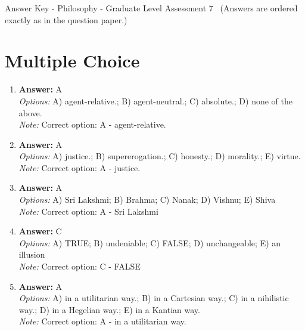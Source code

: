 \documentclass[12pt]{article}
\begin{document}
\begin{center}
Answer Key - Philosophy - Graduate Level Assessment 7 \
\small (Answers are ordered exactly as in the question paper.)
\end{center}

\section*{Multiple Choice}
\begin{enumerate}[label=\arabic*.]
\item \textbf{Answer:} A
\\ \textit{Options:} A) agent-relative.; B) agent-neutral.; C) absolute.; D) none of the above.
\\ \textit{Note:} Correct option: A - agent-relative.
\item \textbf{Answer:} A
\\ \textit{Options:} A) justice.; B) supererogation.; C) honesty.; D) morality.; E) virtue.
\\ \textit{Note:} Correct option: A - justice.
\item \textbf{Answer:} A
\\ \textit{Options:} A) Sri Lakshmi; B) Brahma; C) Nanak; D) Vishnu; E) Shiva
\\ \textit{Note:} Correct option: A - Sri Lakshmi
\item \textbf{Answer:} C
\\ \textit{Options:} A) TRUE; B) undeniable; C) FALSE; D) unchangeable; E) an illusion
\\ \textit{Note:} Correct option: C - FALSE
\item \textbf{Answer:} A
\\ \textit{Options:} A) in a utilitarian way.; B) in a Cartesian way.; C) in a nihilistic way.; D) in a Hegelian way.; E) in a Kantian way.
\\ \textit{Note:} Correct option: A - in a utilitarian way.
\end{enumerate}
\end{document}
